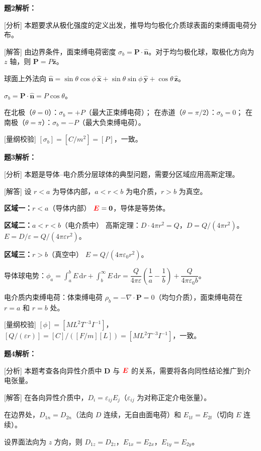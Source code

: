 \documentclass[11pt,a4paper,openany,oneside]{book}
\newcommand{\diff}{\mathrm{d}}
\newcommand{\vecE}{\textcolor{red}{\vect{E}}}
\newcommand{\eps}{\varepsilon}
\newcommand{\vect}[1]{\bm{#1}}
\newcommand{\unitvec}[1]{\hat{\vect{#1}}}
\newcommand{\divg}{\nabla\cdot}
\begin{document}
\textbf{题2解析：}

[分析] 本题要求从极化强度的定义出发，推导均匀极化介质球表面的束缚面电荷分布。

[解答] 由边界条件，面束缚电荷密度 $\sigma_b = \vect{P}\cdot\unitvec{n}$。对于均匀极化球，取极化方向为 $z$ 轴，则 $\vect{P} = P\unitvec{z}$。

球面上外法向 $\unitvec{n} = \sin\theta\cos\phi\,\unitvec{x} + \sin\theta\sin\phi\,\unitvec{y} + \cos\theta\,\unitvec{z}$。

$\sigma_b = \vect{P}\cdot\unitvec{n} = P\cos\theta$。

在北极（$\theta = 0$）：$\sigma_b = +P$（最大正束缚电荷）；
在赤道（$\theta = \pi/2$）：$\sigma_b = 0$；
在南极（$\theta = \pi$）：$\sigma_b = -P$（最大负束缚电荷）。\qedsymbol

[量纲校验] $[\sigma_b] = [C/m^2] = [P]$，一致。\qedsymbol

\textbf{题3解析：}

[分析] 本题是导体--电介质分层球体的典型问题，需要分区域应用高斯定理。

[解答] 设 $r < a$ 为导体内部，$a < r < b$ 为电介质，$r > b$ 为真空。

\textbf{区域一：$r < a$}（导体内部）
$\vecE = \vect{0}$，导体是等势体。

\textbf{区域二：$a < r < b$}（电介质中）
高斯定理：$D \cdot 4\pi r^2 = Q$，$D = Q/(4\pi r^2)$。
$E = D/\eps = Q/(4\pi\eps r^2)$。

\textbf{区域三：$r > b$}（真空中）
$E = Q/(4\pi\eps_0 r^2)$。

导体球电势：$\phi_a = \int_a^b E\,\diff r + \int_b^\infty E\,\diff r = \dfrac{Q}{4\pi\eps}\left(\dfrac{1}{a} - \dfrac{1}{b}\right) + \dfrac{Q}{4\pi\eps_0 b}$。

电介质内束缚电荷：体束缚电荷 $\rho_b = -\divg\vect{P} = 0$（均匀介质），面束缚电荷在 $r=a$ 和 $r=b$ 处。

[量纲校验] $[\phi] = [ML^2T^{-3}I^{-1}]$，$[Q/(\eps r)] = [C]/([F/m][L]) = [ML^2T^{-3}I^{-1}]$，一致。\qedsymbol

\textbf{题4解析：}

[分析] 本题考查各向异性介质中 $\vect{D}$ 与 $\vecE$ 的关系，需要将各向同性结论推广到介电张量。

[解答] 在各向异性介质中，$D_i = \eps_{ij}E_j$（$\eps_{ij}$ 为对称正定介电张量）。

在边界处，$D_{1n} = D_{2n}$（法向 $D$ 连续，无自由面电荷）和 $E_{1t} = E_{2t}$（切向 $E$ 连续）。

设界面法向为 $z$ 方向，则 $D_{1z} = D_{2z}$，$E_{1x} = E_{2x}$，$E_{1y} = E_{2y}$。
\end{document}
